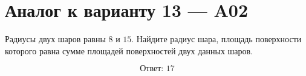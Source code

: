 \documentclass[12pt,a4paper]{article}
\begin{document}
\section*{Аналог к варианту 13 — A02}

Радиусы двух шаров равны \(8\) и \(15\). Найдите радиус шара, площадь поверхности которого равна сумме площадей поверхностей двух данных шаров.

\begin{center}
\end{center}

\[
\boxed{\text{Ответ: }17}
\]
\end{document}
